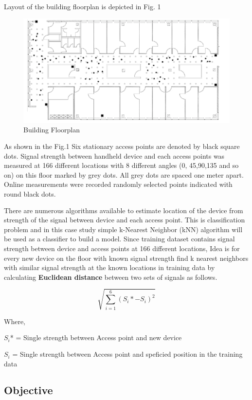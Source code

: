 \documentclass[
]{article}
\begin{document}
Layout of the building floorplan is depicted in Fig. 1

\begin{figure}[H]

{\centering \includegraphics[width=0.8\linewidth,height=0.6\textheight,]{images/Picture1} 

}

\caption{Building Floorplan}\label{fig:unnamed-chunk-2}
\end{figure}

As shown in the Fig.1 Six stationary access points are denoted by black
square dots. Signal strength between handheld device and each access
points was measured at 166 different locations with 8 different angles
(0, 45,90,135 and so on) on this floor marked by grey dots. All grey
dots are spaced one meter apart. Online measurements were recorded
randomly selected points indicated with round black dots.

There are numerous algorithms available to estimate location of the
device from strength of the signal between device and each access point.
This is classification problem and in this case study simple k-Nearest
Neighbor (kNN) algorithm will be used as a classifier to build a model.
Since training dataset contains signal strength between device and
access points at 166 different locations, Idea is for every new device
on the floor with known signal strength find k nearest neighbors with
similar signal strength at the known locations in training data by
calculating \textbf{Euclidean distance} between two sets of signals as
follows.

\[\sqrt{\sum_{i=1}^6(S_i* - S_i)^2}\]

Where,

\(S_i\)* = Single strength between Access point and new device

\(S_i\) = Single strength between Access point and speficied position in
the training data

\hypertarget{objective}{%
\subsection{Objective}\label{objective}}
\end{document}
